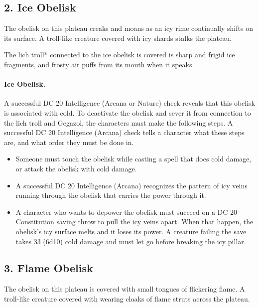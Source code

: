 \documentclass[10pt,a4paper,twoside,twocolumn,openany,bg=print,nodeprecatedcode]{dndbook}
\begin{document}
\subsection{2. Ice Obelisk}
\begin{DndReadAloud}{}
The obelisk on this plateau creaks and moans as an icy rime continually shifts on its surface. A troll-like creature covered with icy shards stalks the plateau.
\end{DndReadAloud}

The lich troll* connected to the ice obelisk is covered is sharp and frigid ice fragments, and frosty air puffs from its mouth when it speaks.
\paragraph{Ice Obelisk.}
A successful DC 20 Intelligence (Arcana or Nature) check reveals that this obelisk is associated with cold. To deactivate the obelisk and sever it from connection to the lich troll and Gegazol, the characters must make the following steps. A successful DC 20 Intelligence (Arcana) check tells a character what these steps are, and what order they must be done in.

\begin{itemize}
\item Someone must touch the obelisk while casting a spell that does cold damage, or attack the obelisk with cold damage.
\item A successful DC 20 Intelligence (Arcana) recognizes the pattern of icy veins running through the obelisk that carries the power through it.
\item A character who wants to depower the obelisk must succeed on a DC 20 Constitution saving throw to pull the icy veins apart. When that happen, the obelisk's icy surface melts and it loses its power. A creature failing the save takes 33 (6d10) cold damage and must let go before breaking the icy pillar.
\end{itemize}

\subsection{3. Flame Obelisk}
\begin{DndReadAloud}{}
The obelisk on this plateau is covered with small tongues of flickering flame. A troll-like creature covered with wearing cloaks of flame struts across the plateau.
\end{DndReadAloud}
\end{document}
